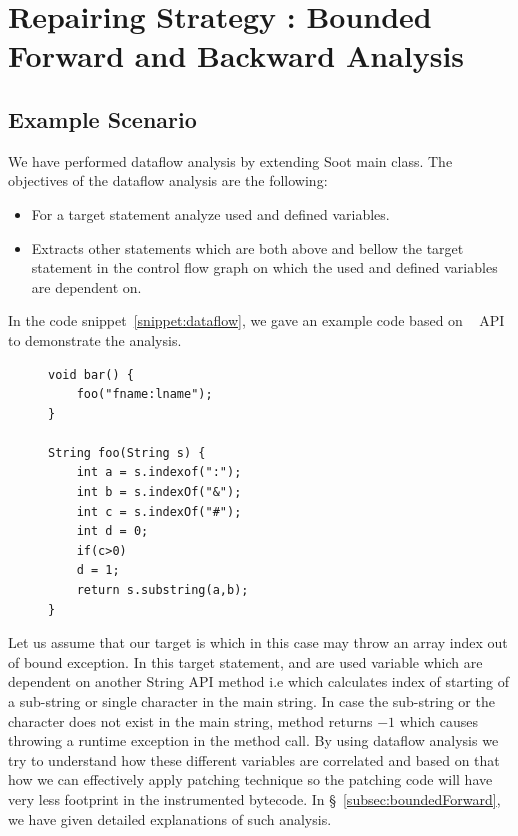 

\section{Repairing Strategy : Bounded Forward and Backward Analysis}
\label{sec:boundedAnalysis}

\subsection{Example Scenario}
\label{subsec:exampleScenario}

We have performed dataflow analysis by extending Soot main class. The objectives
of the dataflow analysis are the following:

\begin{itemize}
  \item For a target statement analyze used and defined variables.
  
  \item Extracts other statements which are both above and bellow the target
  statement in the control flow graph on which the used and defined variables
  are dependent on.
  
\end{itemize}

In the code snippet~\ref{snippet:dataflow}, we gave an example code based on
\java\  API to demonstrate the analysis.


\lstset{language=Java, caption=Dataflow analysis, label=snippet:dataflow}
\begin{figure}[t]
\begin{lstlisting}
void bar() {
    foo("fname:lname");
}

String foo(String s) {
    int a = s.indexof(":");
    int b = s.indexOf("&");
    int c = s.indexOf("#");
    int d = 0;
    if(c>0)
	d = 1;
    return s.substring(a,b);
}
\end{lstlisting}
\end{figure}

Let us assume that our target is  which in this case
may throw an array index out of bound exception. In this target statement,
 and  are used variable which are dependent on another
String API method i.e  which calculates index of starting of a
sub-string or single character in the main string. In case the sub-string or the
character does not exist in the main string,  method returns
$-1$ which causes throwing a runtime exception in the 
method call.
\newline
By using dataflow analysis we try to understand how these different variables
are correlated and based on that how we can effectively apply patching technique
so the patching code will have very less footprint in the instrumented bytecode.
In \S~\ref{subsec:boundedForward}, we have given detailed
explanations
of such analysis.


